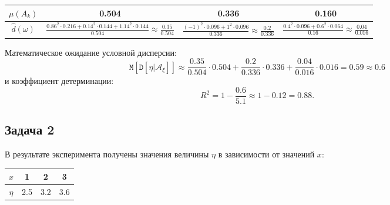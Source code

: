 \documentclass[a4paper,12pt]{article}
\newcommand{\expectation}[1]{\texttt{M} \left[ #1 \right]}
\newcommand{\cvariance}[2]{\texttt{D} \left[ #1 | #2 \right]}
\begin{document}
\begin{center}
\begin{tabular}{|c|c|c|c|c|c|c|c|c|}
        \hline
        $\mu(A_k)$                  & \multicolumn{3}{|c|}{0.504}                                                                                                   & \multicolumn{3}{|c|}{0.336}                                                                          & \multicolumn{2}{|c|}{0.160}                                                                                                                                           \\
        \hline
        $\widehat{d}(\omega)$       & \multicolumn{3}{|c|}{$\frac{0.86^2 \cdot 0.216 + 0.14^2 \cdot 0.144 + 1.14^2 \cdot 0.144}{0.504} \approx \frac{0.35}{0.504}$} & \multicolumn{3}{|c|}{$\frac{(-1)^2 \cdot 0.096 + 1^2 \cdot 0.096}{0.336} \approx \frac{0.2}{0.336}$} & \multicolumn{2}{|c|}{$\frac{0.4^2 \cdot 0.096 + 0.6^2 \cdot 0.064}{0.16} \approx \frac{0.04}{0.016}$}                                                                 \\
        \hline
    \end{tabular}
\end{center}

Математическое ожидание условной дисперсии:
\[
    \expectation{\cvariance{\eta}{\mathcal{A}_\xi}}
    \approx \frac{0.35}{0.504} \cdot 0.504 + \frac{0.2}{0.336} \cdot 0.336 + \frac{0.04}{0.016} \cdot 0.016
    = 0.59
    \approx 0.6
\]
и коэффициент детерминации:
\[
    R^2
    = 1 - \frac{0.6}{5.1}
    \approx 1 - 0.12
    = 0.88 .
\]

\subsection*{Задача 2}

В результате эксперимента получены значения величины $\eta$ в зависимости от значений $x$:

\begin{tabular}{|c|c|c|c|}
    \hline
    $x$    & 1   & 2   & 3   \\
    \hline
    $\eta$ & 2.5 & 3.2 & 3.6 \\
    \hline
\end{tabular}
\end{document}
